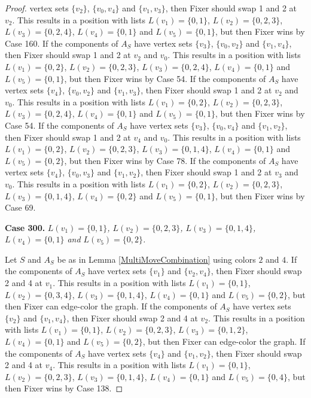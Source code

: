 \documentclass[12pt]{amsart}
\theoremstyle{plain}
\theoremstyle{definition}
\theoremstyle{remark}
\begin{document}
\begin{proof}
vertex sets $\{v_2\}$, $\{v_0, v_4\}$ and $\{v_1, v_3\}$, then Fixer should swap 1 and 2 at $v_2$. This results in a position with lists $L(v_1) = \{0, 1\}$, $L(v_2) = \{0, 2, 3\}$, $L(v_3) = \{0, 2, 4\}$, $L(v_4) = \{0, 1\}$ and $L(v_5) = \{0, 1\}$, but then Fixer wins by Case 160. If the components of $A_S$ have vertex sets $\{v_3\}$, $\{v_0, v_2\}$ and $\{v_1, v_4\}$, then Fixer should swap 1 and 2 at $v_2$ and $v_0$. This results in a position with lists $L(v_1) = \{0, 2\}$, $L(v_2) = \{0, 2, 3\}$, $L(v_3) = \{0, 2, 4\}$, $L(v_4) = \{0, 1\}$ and $L(v_5) = \{0, 1\}$, but then Fixer wins by Case 54. If the components of $A_S$ have vertex sets $\{v_4\}$, $\{v_0, v_2\}$ and $\{v_1, v_3\}$, then Fixer should swap 1 and 2 at $v_2$ and $v_0$. This results in a position with lists $L(v_1) = \{0, 2\}$, $L(v_2) = \{0, 2, 3\}$, $L(v_3) = \{0, 2, 4\}$, $L(v_4) = \{0, 1\}$ and $L(v_5) = \{0, 1\}$, but then Fixer wins by Case 54. If the components of $A_S$ have vertex sets $\{v_3\}$, $\{v_0, v_4\}$ and $\{v_1, v_2\}$, then Fixer should swap 1 and 2 at $v_4$ and $v_0$. This results in a position with lists $L(v_1) = \{0, 2\}$, $L(v_2) = \{0, 2, 3\}$, $L(v_3) = \{0, 1, 4\}$, $L(v_4) = \{0, 1\}$ and $L(v_5) = \{0, 2\}$, but then Fixer wins by Case 78. If the components of $A_S$ have vertex sets $\{v_4\}$, $\{v_0, v_3\}$ and $\{v_1, v_2\}$, then Fixer should swap 1 and 2 at $v_3$ and $v_0$. This results in a position with lists $L(v_1) = \{0, 2\}$, $L(v_2) = \{0, 2, 3\}$, $L(v_3) = \{0, 1, 4\}$, $L(v_4) = \{0, 2\}$ and $L(v_5) = \{0, 1\}$, but then Fixer wins by Case 69. 

\noindent\textbf{Case 300.  }\textit{$L(v_1) = \{0, 1\}$, $L(v_2) = \{0, 2, 3\}$, $L(v_3) = \{0, 1, 4\}$, $L(v_4) = \{0, 1\}$ and $L(v_5) = \{0, 2\}$.}

Let $S$ and $A_S$ be as in Lemma \ref{MultiMoveCombination} using colors $2$ and $4$. If the components of $A_S$ have vertex sets $\{v_1\}$ and $\{v_2, v_4\}$, then Fixer should swap 2 and 4 at $v_1$. This results in a position with lists $L(v_1) = \{0, 1\}$, $L(v_2) = \{0, 3, 4\}$, $L(v_3) = \{0, 1, 4\}$, $L(v_4) = \{0, 1\}$ and $L(v_5) = \{0, 2\}$, but then Fixer can edge-color the graph. If the components of $A_S$ have vertex sets $\{v_2\}$ and $\{v_1, v_4\}$, then Fixer should swap 2 and 4 at $v_2$. This results in a position with lists $L(v_1) = \{0, 1\}$, $L(v_2) = \{0, 2, 3\}$, $L(v_3) = \{0, 1, 2\}$, $L(v_4) = \{0, 1\}$ and $L(v_5) = \{0, 2\}$, but then Fixer can edge-color the graph. If the components of $A_S$ have vertex sets $\{v_4\}$ and $\{v_1, v_2\}$, then Fixer should swap 2 and 4 at $v_4$. This results in a position with lists $L(v_1) = \{0, 1\}$, $L(v_2) = \{0, 2, 3\}$, $L(v_3) = \{0, 1, 4\}$, $L(v_4) = \{0, 1\}$ and $L(v_5) = \{0, 4\}$, but then Fixer wins by Case 138. 


\end{proof}
\end{document}
